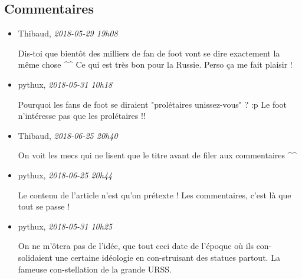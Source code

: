 \hypertarget{commentaires}{%
\subsection{Commentaires}\label{commentaires}}

\begin{itemize}
\item
  Thibaud, \emph{2018-05-29 19h08}

  Dis-toi que bientôt des milliers de fan de foot vont se dire
  exactement la même chose \^{}\^{} Ce qui est très bon pour la Russie.
  Perso ça me fait plaisir !
\item
  pythux, \emph{2018-05-31 10h18}

  Pourquoi les fans de foot se diraient "prolétaires unissez-vous" ? :p
  Le foot n'intéresse pas que les prolétaires !!
\item
  Thibaud, \emph{2018-06-25 20h40}

  On voit les mecs qui ne lisent que le titre avant de filer aux
  commentaires \^{}\^{}
\item
  pythux, \emph{2018-06-25 20h44}

  Le contenu de l'article n'est qu'on prétexte ! Les commentaires, c'est
  là que tout se passe !
\item
  pythux, \emph{2018-05-31 10h25}

  On ne m'ôtera pas de l'idée, que tout ceci date de l'époque où ils
  con-solidaient une certaine idéologie en con-struisant des statues
  partout. La fameuse con-stellation de la grande URSS.
\end{itemize}

